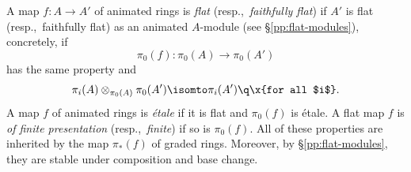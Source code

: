 






 \label{pp:topologies}
A map $f\colon A\to A'$ of animated rings is \emph{flat} (resp.,~\emph{faithfully flat}) if $A'$ is flat (resp.,~faithfully flat) as an animated $A$-module (see \S\ref{pp:flat-modules}), concretely, if
\[
\pi_0(f)\colon \pi_0(A) \to \pi_0(A')
\]
has the same property and
\[
\pi_i(A) \otimes_{\pi_0(A)}\pi_0(A') \isomto \pi_i(A') \q \x{for all $i$}.
\]
A map $f$ of animated rings is \emph{\'{e}tale} if it is flat and $\pi_0(f)$ is \'{e}tale. A flat map $f$ is \emph{of finite presentation} (resp.,~\emph{finite}) if so is $\pi_0(f)$. All of these properties are inherited by the map $\pi_*(f)$ of graded rings. Moreover, by \S\ref{pp:flat-modules}, they are stable under composition and base change.


